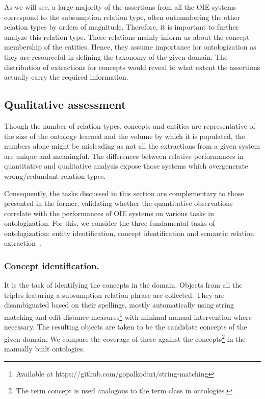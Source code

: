 \documentclass{llncs}
\begin{document}
As we will see, a large majority of the assertions from all the OIE systems correspond to the subsumption relation type, often outnumbering the other relation types by orders of magnitude. Therefore, it is important to further analyze this relation type. These relations mainly inform us about the concept membership of the entities. Hence, they assume importance for ontologization as they are resourceful in defining the taxonomy of the given domain. The distribution of extractions for concepts would reveal to what extent the assertions actually carry the required information.

\subsection{Qualitative assessment}
Though the number of relation-types, concepts and entities are representative of the size of the ontology learned and the volume by which it is populated, the numbers alone might be misleading as not all the extractions from a given system are unique and meaningful. The differences between relative performances in quantitative and qualitative analysis expose those systems which overgenerate wrong/redundant relation-types.

Consequently, the tasks discussed in this section are complementary to those presented in the former, validating whether the quantitative observations correlate with the performances of OIE systems on various tasks in ontologization. For this, we consider the three fundamental tasks of ontologization: entity identification, concept identification and semantic relation extraction~\cite{Petasis2011}.


\subsubsection{Concept identification.} It is the task of identifying the concepts in the domain. Objects from all the triples featuring a subsumption relation phrase are collected. They are disambiguated based on their spellings, mostly automatically using string matching and edit distance measures\footnote{Available at https://github.com/gopalkoduri/string-matching} with minimal manual intervention where necessary. The resulting objects are taken to be the candidate concepts of the given domain. We compare the coverage of these against the concepts\footnote{The term concept is used analogous to the term class in ontologies.} in the manually built ontologies.
\end{document}
